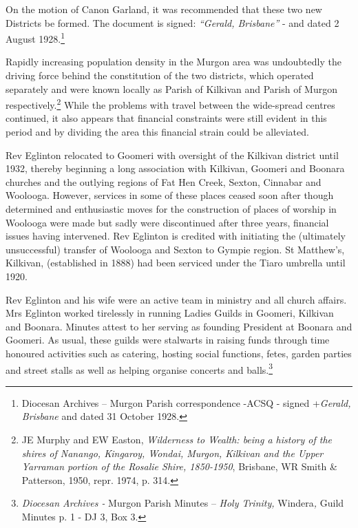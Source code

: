 On the motion of Canon Garland, it was recommended that these two new Districts be formed. The document is signed: \emph{``Gerald, Brisbane''} - and dated 2 August 1928.\footnote{Diocesan Archives -- Murgon Parish correspondence -ACSQ - signed +\emph{Gerald, Brisbane} and dated 31 October 1928.}


Rapidly increasing population density in the Murgon area was undoubtedly the driving force behind the constitution of the two districts, which operated separately and were known locally as Parish of Kilkivan and Parish of Murgon respectively.\footnote{JE Murphy and EW Easton, \emph{Wilderness to Wealth: being a history of the shires of Nanango, Kingaroy, Wondai, Murgon, Kilkivan and the Upper Yarraman portion of the Rosalie Shire, 1850-1950}, Brisbane, WR Smith \& Patterson, 1950, repr. 1974, p. 314.} While the problems with travel between the wide-spread centres continued, it also appears that financial constraints were still evident in this period and by dividing the area this financial strain could be alleviated.


Rev Eglinton relocated to Goomeri with oversight of the Kilkivan district until 1932, thereby beginning a long association with Kilkivan, Goomeri and Boonara churches and the outlying regions of Fat Hen Creek, Sexton, Cinnabar and Woolooga. However, services in some of these places ceased soon after though determined and enthusiastic moves for the construction of places of worship in Woolooga were made but sadly were discontinued after three years, financial issues having intervened. Rev Eglinton is credited with initiating the (ultimately unsuccessful) transfer of Woolooga and Sexton to Gympie region. St Matthew's, Kilkivan, (established in 1888) had been serviced under the Tiaro umbrella until 1920.



Rev Eglinton and his wife were an active team in ministry and all church affairs. Mrs Eglinton worked tirelessly in running Ladies Guilds in Goomeri, Kilkivan and Boonara. Minutes attest to her serving as founding President at Boonara and Goomeri. As usual, these guilds were stalwarts in raising funds through time honoured activities such as catering, hosting social functions, fetes, garden parties and street stalls as well as helping organise concerts and balls.\footnote{\emph{Diocesan Archives -} Murgon Parish Minutes -- \emph{Holy Trinity,} Windera\emph{,} Guild Minutes p. 1 - DJ 3, Box 3.}


\balance


